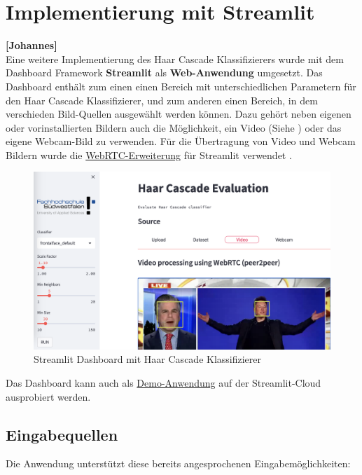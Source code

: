\section{Implementierung mit Streamlit } 
\textbf{[Johannes]} \\

Eine weitere Implementierung des Haar Cascade Klassifizierers wurde 
mit dem Dashboard Framework \textbf{Streamlit} als \textbf{Web-Anwendung} umgesetzt. Das Dashboard enthält
zum einen einen Bereich mit unterschiedlichen Parametern für den 
Haar Cascade Klassifizierer, und zum anderen einen Bereich, in dem 
verschieden Bild-Quellen ausgewählt werden können. Dazu gehört
neben eigenen oder vorinstallierten Bildern auch die Möglichkeit, ein Video (Siehe )
oder das eigene Webcam-Bild zu verwenden. Für die Übertragung von Video und Webcam Bildern wurde die 
\href{https://github.com/whitphx/streamlit-webrtc}{WebRTC-Erweiterung} für Streamlit verwendet .

\begin{figure}[h]
 	\includegraphics[scale=0.3]{../images/streamlit/video_example.png}
	\caption{Streamlit Dashboard mit Haar Cascade Klassifizierer}
	\label{fig:streamlit1}
\end{figure}

Das Dashboard kann auch als \href{https://jk-fhswf-pki-a22-app-app-codcuk.streamlit.app/}{Demo-Anwendung}
auf der Streamlit-Cloud ausprobiert werden. 

\subsection{Eingabequellen}
Die Anwendung unterstützt diese bereits angesprochenen Eingabemöglichkeiten:

